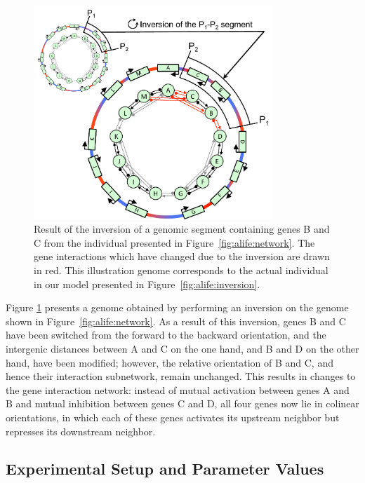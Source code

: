 \begin{figure}[H]
\centering
\includegraphics[width=0.8\textwidth]{alife/img/genome_inversion.pdf}
\caption[Effect of an inversion on the hand-drawn genome in Figure \ref{fig:alife:network}]{Result of the inversion of a genomic segment containing genes B and C from the individual presented in Figure~\ref{fig:alife:network}.
The gene interactions which have changed due to the inversion are drawn in red.
This illustration genome corresponds to the actual individual in our model presented in Figure~\ref{fig:alife:inversion}.}
\label{fig:alife:genome_inv}
\end{figure}

Figure \ref{fig:alife:genome_inv} presents a genome obtained by performing an inversion on the genome shown in Figure~\ref{fig:alife:network}.
As a result of this inversion, genes B and C have been switched from the forward to the backward orientation, and the intergenic distances between A and C on the one hand, and B and D on the other hand, have been modified; however, the relative orientation of B and C, and hence their interaction subnetwork, remain unchanged.
This results in changes to the gene interaction network: instead of mutual activation between genes A and B and mutual inhibition between genes C and D, all four genes now lie in colinear orientations, in which each of these genes activates its upstream neighbor but represses its downstream neighbor.

\subsection{Experimental Setup and Parameter Values}

